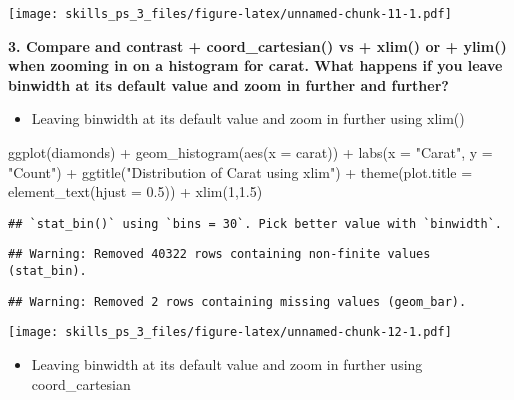 \documentclass[
]{article}
\newenvironment{Shaded}{\begin{snugshade}}{\end{snugshade}}
\newcommand{\AttributeTok}[1]{\textcolor[rgb]{0.77,0.63,0.00}{#1}}
\newcommand{\DecValTok}[1]{\textcolor[rgb]{0.00,0.00,0.81}{#1}}
\newcommand{\FloatTok}[1]{\textcolor[rgb]{0.00,0.00,0.81}{#1}}
\newcommand{\FunctionTok}[1]{\textcolor[rgb]{0.00,0.00,0.00}{#1}}
\newcommand{\NormalTok}[1]{#1}
\newcommand{\SpecialCharTok}[1]{\textcolor[rgb]{0.00,0.00,0.00}{#1}}
\newcommand{\StringTok}[1]{\textcolor[rgb]{0.31,0.60,0.02}{#1}}
\providecommand{\tightlist}{%
  \setlength{\itemsep}{0pt}\setlength{\parskip}{0pt}}
\begin{document}
\texttt{[image: skills\_ps\_3\_files/figure-latex/unnamed-chunk-11-1.pdf]}

\textbf{3. Compare and contrast + coord\_cartesian() vs + xlim() or +
ylim() when zooming in on a histogram for carat. What happens if you
leave binwidth at its default value and zoom in further and further?}

\begin{itemize}
\tightlist
\item
  Leaving binwidth at its default value and zoom in further using xlim()
\end{itemize}

\begin{Shaded}
\begin{Highlighting}[]
 \FunctionTok{ggplot}\NormalTok{(diamonds) }\SpecialCharTok{+} 
  \FunctionTok{geom\_histogram}\NormalTok{(}\FunctionTok{aes}\NormalTok{(}\AttributeTok{x =}\NormalTok{ carat)) }\SpecialCharTok{+}
  \FunctionTok{labs}\NormalTok{(}\AttributeTok{x =} \StringTok{"Carat"}\NormalTok{, }\AttributeTok{y =} \StringTok{"Count"}\NormalTok{) }\SpecialCharTok{+}
  \FunctionTok{ggtitle}\NormalTok{(}\StringTok{"Distribution of Carat using xlim"}\NormalTok{) }\SpecialCharTok{+} 
  \FunctionTok{theme}\NormalTok{(}\AttributeTok{plot.title =} \FunctionTok{element\_text}\NormalTok{(}\AttributeTok{hjust =} \FloatTok{0.5}\NormalTok{)) }\SpecialCharTok{+} 
  \FunctionTok{xlim}\NormalTok{(}\DecValTok{1}\NormalTok{,}\FloatTok{1.5}\NormalTok{)}
\end{Highlighting}
\end{Shaded}

\begin{verbatim}
## `stat_bin()` using `bins = 30`. Pick better value with `binwidth`.
\end{verbatim}

\begin{verbatim}
## Warning: Removed 40322 rows containing non-finite values (stat_bin).
\end{verbatim}

\begin{verbatim}
## Warning: Removed 2 rows containing missing values (geom_bar).
\end{verbatim}

\texttt{[image: skills\_ps\_3\_files/figure-latex/unnamed-chunk-12-1.pdf]}

\begin{itemize}
\tightlist
\item
  Leaving binwidth at its default value and zoom in further using
  coord\_cartesian
\end{itemize}
\end{document}
